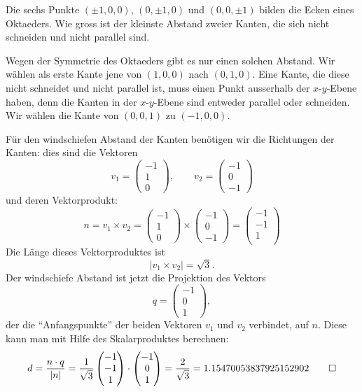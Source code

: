 Die sechs Punkte $(\pm 1,0,0)$, $(0,\pm1,0)$ und $(0,0,\pm1)$ bilden
die Ecken eines Oktaeders.
Wie gross ist der kleinste Abstand zweier Kanten, die sich
nicht schneiden und nicht parallel sind.


\begin{loesung}
Wegen der Symmetrie des Oktaeders gibt es nur einen solchen Abstand.
Wir wählen als erste Kante jene von $(1,0,0)$ nach $(0,1,0)$. Eine
Kante, die diese nicht schneidet und nicht parallel ist, muss einen
Punkt ausserhalb der $x$-$y$-Ebene haben, denn die Kanten in der
$x$-$y$-Ebene sind entweder parallel oder schneiden. Wir wählen die
Kante von $(0,0,1)$ zu $(-1,0,0)$.

Für den windschiefen Abstand der Kanten benötigen wir die Richtungen
der Kanten: dies sind die Vektoren
\[
v_1=\begin{pmatrix}
-1\\1\\0
\end{pmatrix}
,\qquad
v_2=\begin{pmatrix}
-1\\0\\-1
\end{pmatrix}
\]
und deren Vektorprodukt:
\[
n=v_1\times v_2
=
\begin{pmatrix}
-1\\1\\0
\end{pmatrix}
\times
\begin{pmatrix}
-1\\0\\-1
\end{pmatrix}
=
\begin{pmatrix}
-1\\
-1\\
1\\
\end{pmatrix}
\]
Die Länge  dieses Vektorproduktes ist
\[
|v_1\times v_2|=\sqrt{3}.
\]
Der windschiefe Abstand ist jetzt die Projektion des Vektors
\[
q=\begin{pmatrix}
-1\\0\\1
\end{pmatrix},
\]
der die ``Anfangspunkte''  der beiden Vektoren $v_1$ und $v_2$
verbindet, auf $n$. Diese kann man mit Hilfe des Skalarproduktes
berechnen:
\[
d=\frac{n\cdot q}{|n|}=
\frac1{\sqrt{3}} \begin{pmatrix}-1\\-1\\1\end{pmatrix}\cdot\begin{pmatrix}
-1\\0\\1
\end{pmatrix}
=\frac2{\sqrt{3}}
=1.15470053837925152902
\qedhere
\]
\end{loesung}

